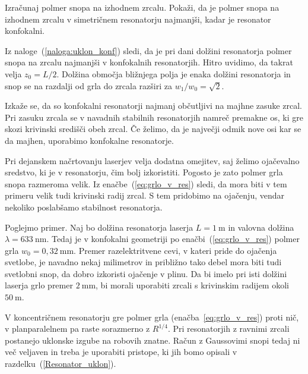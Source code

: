 \begin{definition}
\label{naloga:uklon_konf}
 Izračunaj polmer
 snopa na izhodnem zrcalu. Pokaži, da je polmer snopa na izhodnem zrcalu v 
 simetričnem resonatorju najmanjši, kadar je resonator konfokalni.
\end{definition} 

Iz naloge~(\ref{naloga:uklon_konf}) sledi, da je pri dani dolžini 
resonatorja polmer snopa na zrcalu najmanjši v konfokalnih 
resonatorjih.  Hitro uvidimo, da takrat 
velja $z_{0}=L/2$. Dolžina območja bližnjega polja je 
enaka dolžini resonatorja in snop se na razdalji od grla do zrcala razširi
za $w_1/w_0=\sqrt{2}$. 
\begin{remark}
Izkaže se, da so konfokalni resonatorji najmanj občutljivi na majhne zasuke zrcal. 
Pri zasuku zrcala se v navadnih stabilnih resonatorjih namreč premakne os, ki gre skozi 
krivinski središči obeh zrcal. Če želimo, da je največji odmik nove osi kar se da
majhen, uporabimo konfokalne resonatorje. 
\end{remark}

Pri dejanskem načrtovanju laserjev velja dodatna omejitev, saj želimo 
ojačevalno sredstvo, ki je v resonatorju, čim bolj izkoristiti. Pogosto je zato 
polmer grla snopa razmeroma velik. Iz enačbe~(\ref{eq:grlo_v_res})
sledi, da mora biti v tem primeru velik tudi krivinski radij zrcal. S tem
pridobimo na ojačenju, vendar nekoliko poslabšamo stabilnost resonatorja.

Poglejmo primer. Naj bo dolžina resonatorja laserja $L=1~\si{\metre}$ in valovna
dolžina $\lambda = 633~\si{\nano\metre}$. Tedaj je v konfokalni geometriji po enačbi~(\ref{eq:grlo_v_res})
polmer grla $w_{0}=0,32~\si{\milli\metre}$. Premer razelektritvene cevi, v kateri pride
do ojačenja svetlobe, je navadno
nekaj milimetrov in približno tako debel mora biti tudi svetlobni
snop, da dobro izkoristi ojačenje v plinu.
Da bi imelo pri isti dolžini laserja grlo premer $2~\si{\milli\metre}$, bi morali
uporabiti zrcali s krivinskim radijem okoli $50~\si{\metre}$. 

V koncentričnem resonatorju gre polmer grla (enačba~\ref{eq:grlo_v_res}) proti nič, 
v planparalelnem pa raste sorazmerno z $R^{1/4}$. Pri resonatorjih z ravnimi zrcali 
postanejo uklonske izgube na robovih znatne. Račun z Gaussovimi snopi tedaj ni več veljaven
in treba je uporabiti pristope, ki jih bomo opisali
v razdelku~(\ref{Resonator_uklon}).

